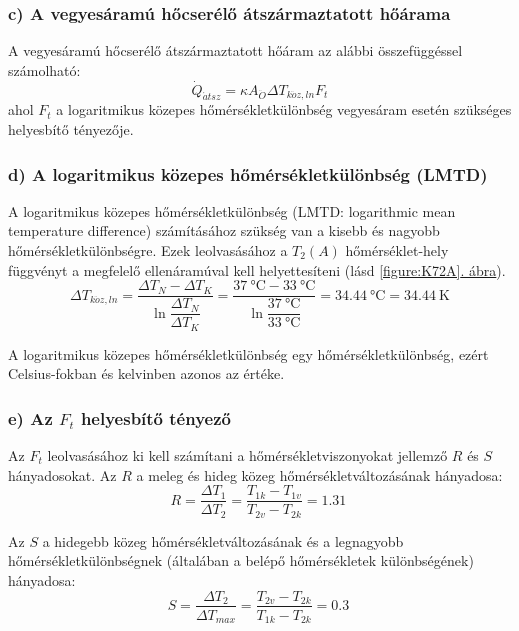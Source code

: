 \subsubsection*{c) A vegyesáramú hőcserélő átszármaztatott hőárama}
A vegyesáramú hőcserélő átszármaztatott hőáram az alábbi összefüggéssel számolható:
\begin{equation}
	\dot{Q}_{\acute{a}tsz} = \kappa A_{\ddot{O}} \Delta T_{k\ddot{o}z,ln} F_t
\end{equation}
ahol $F_t$ a logaritmikus közepes hőmérsékletkülönbség vegyesáram esetén szükséges helyesbítő tényezője.

\subsubsection*{d) A logaritmikus közepes hőmérsékletkülönbség (LMTD)}
A logaritmikus közepes hőmérsékletkülönbség (LMTD: logarithmic mean temperature difference) számításához szükség van a kisebb és nagyobb hőmérsékletkülönbségre. Ezek leolvasásához a $T_2\!\left(A\right)$ hőmérséklet-hely függvényt a megfelelő ellenáramúval kell helyettesíteni (lásd \hyperref[figure:K72A]{\ref{figure:K72A}. ábra}).
\begin{equation}
	\Delta T_{k\ddot{o}z,ln} 
	= 
	\dfrac{\Delta T_N - \Delta T_K}{\ln\dfrac{\Delta T_N}{\Delta T_K}} 
	= 
	\dfrac{\SI{37}{\celsius} - \SI{33}{\celsius}}{\ln\dfrac{\SI{37}{\celsius}}{\SI{33}{\celsius}}} 
	= 
	\SI{34.44}{\celsius} = \SI{34.44}{\kelvin}
\end{equation}

A logaritmikus közepes hőmérsékletkülönbség egy hőmérsékletkülönbség, ezért Celsius-fokban és kelvinben azonos az értéke.

\subsubsection*{e) Az $F_t$ helyesbítő tényező}
Az $F_t$ leolvasásához ki kell számítani a hőmérsékletviszonyokat jellemző $R$ és $S$ hányadosokat. Az $R$ a meleg és hideg közeg hőmérsékletváltozásának hányadosa:
\begin{equation}
	R = \dfrac{\Delta T_1}{\Delta T_2} = \dfrac{T_{1k} - T_{1v}}{T_{2v} - T_{2k}} = \SI{1.31}{}
\end{equation}

Az $S$ a hidegebb közeg hőmérsékletváltozásának és a legnagyobb hőmérsékletkülönbségnek (általában a belépő hőmérsékletek különbségének) hányadosa:
\begin{equation}
	S = \dfrac{\Delta T_2}{\Delta T_{max}} = \dfrac{T_{2v} - T_{2k}}{T_{1k} - T_{2k}} = \SI{0.3}{}
\end{equation}

